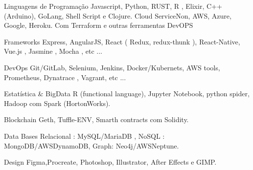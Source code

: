 \vspace{5mm}

\begin{cvskills}

  \cvskill
    {Linguagens de Programação} %
    {Javascript, Python, RUST, R , Elixir, C++ (Arduino), GoLang, Shell Script e Clojure.} %
  \cvskill
    {Cloud} %
    { ServiceNon, AWS, Azure, Google, Heroku. Com Terraform e outras ferramentas DevOPS} %

  \cvskill
    {Frameworks} %
    {Express, AngularJS, React ( Redux, redux-thunk ), React-Native, Vue.js , Jasmine , Mocha ,  etc ...} %

\cvskill
    {DevOps} %
    {Git/GitLab, Selenium, Jenkins, Docker/Kubernets, AWS tools, Prometheus, Dynatrace , Vagrant, etc ...} %

 \cvskill
    {Estatística \& BigData} %
    { R (functional language), Jupyter Notebook, python spider, Hadoop com Spark (HortonWorks).
    } %

 \cvskill
    {Blockchain} %
    { Geth, Tuffle-ENV, Smarth contracts com Solidity.} %

 \cvskill
    {Data Bases} %
    {Relacional : MySQL/MariaDB , NoSQL : MongoDB/AWSDynamoDB, Graph: Neo4j/AWSNeptune.} %

 \cvskill
    {Design} %
    {Figma,Procreate, Photoshop, Illustrator, After Effects e GIMP.} %
    

\end{cvskills}
